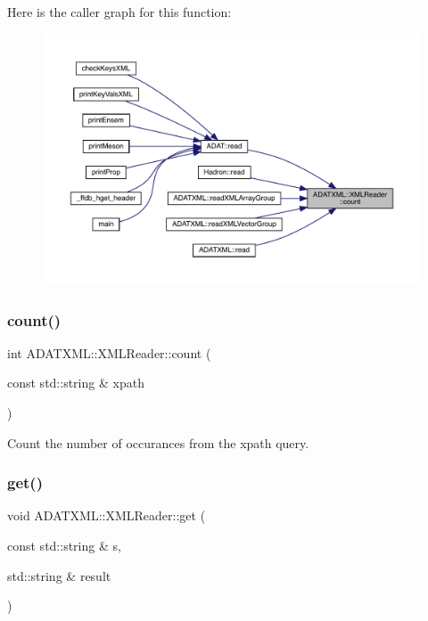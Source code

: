 Here is the caller graph for this function\+:
\nopagebreak
\begin{figure}[H]
\begin{center}
\leavevmode
\includegraphics[width=350pt]{db/d3f/classADATXML_1_1XMLReader_a59584913f1338d956de60adef16a0718_icgraph}
\end{center}
\end{figure}
\mbox{\label{classADATXML_1_1XMLReader_a59584913f1338d956de60adef16a0718}} 
\subsubsection{\texorpdfstring{count()}{count()}\hspace{0.1cm}{\footnotesize\ttfamily [2/2]}}
{\footnotesize\ttfamily int A\+D\+A\+T\+X\+M\+L\+::\+X\+M\+L\+Reader\+::count (\begin{DoxyParamCaption}\item[{const std\+::string \&}]{xpath }\end{DoxyParamCaption})}



Count the number of occurances from the xpath query. 

\mbox{\label{classADATXML_1_1XMLReader_a5ed2bbc9de7ba505e6ce37c1a5f90fee}} 
\subsubsection{\texorpdfstring{get()}{get()}\hspace{0.1cm}{\footnotesize\ttfamily [1/20]}}
{\footnotesize\ttfamily void A\+D\+A\+T\+X\+M\+L\+::\+X\+M\+L\+Reader\+::get (\begin{DoxyParamCaption}\item[{const std\+::string \&}]{s,  }\item[{std\+::string \&}]{result }\end{DoxyParamCaption})\hspace{0.3cm}{\ttfamily [inline]}}

